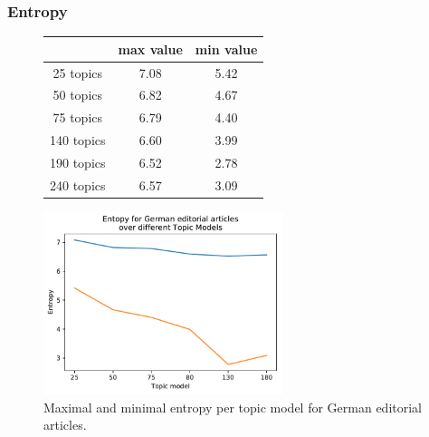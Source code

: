 \subsubsection{Entropy}
\begin{figure}
	\begin{minipage}{0.5\textwidth}
		\centering
	\begin{tabular}[t]{c|cc}
		&max value & min value\\
		\hline
		25 topics&7.08&5.42\\
		50 topics&	6.82&4.67\\
		75 topics&	6.79&4.40\\
		140 topics&	6.60&3.99\\
		190 topics &6.52&2.78\\
		240 topics&	6.57&3.09\\
	\end{tabular}
	\end{minipage}%
	\begin{minipage}{0.5\textwidth}
		\centering
		\includegraphics[width=7cm]{gfx/Eval_IC/German_Editorial_Entropy.pdf}
	\end{minipage}
	\caption{Maximal and minimal entropy per topic model for German editorial articles.}
	\label{entr_german}
\end{figure}
